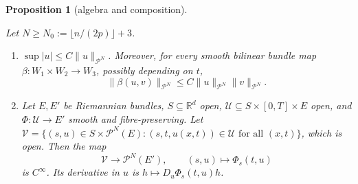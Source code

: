 \documentclass[11pt,reqno]{amsart}
\newtheorem{proposition}[theorem]{Proposition}
\theoremstyle{definition}
\theoremstyle{remark}
\newcommand{\R}{\mathbb{R}}
\newcommand{\Pp}{\mathcal{P}}
\newcommand{\norm}[1]{\lVert #1\rVert}
\newcommand{\abs}[1]{\lvert #1\rvert}
\newcommand{\lean}[1]{}
\newcommand{\uses}[1]{}
\numberwithin{equation}{section}
\begin{document}
\begin{proposition}[algebra and composition]\label{prop:nemytskii}
\lean{ShortTime.ParabolicSpace.bilinear_le, ShortTime.ParabolicSpace.contDiff_comp, ShortTime.FaaDiBruno.exists_tame_bound_graph, ShortTime.FibreMap, ShortTime.FibreMap.exists_tame_pointwise, ShortTime.parabolicInner_le_of_jetSq_le, ShortTime.exists_jetSq_le_parabolicInner, ShortTime.SmoothExtension.exists_contDiffOn_extension, ShortTime.FibreMap.fibreDeriv, ShortTime.FibreMap.taylorMap, ShortTime.FibreMap.exists_block_bound, ShortTime.FibreMap.exists_derivFam_bound, ShortTime.FibreMap.exists_taylor_bound}
\uses{def:parabolic, lem:embedding}
Let $N\ge N_0:=\lfloor n/(2p)\rfloor+3$.
\begin{enumerate}[label=(\roman*),nosep]
\item $\sup\abs u\le C\norm u_{\Pp^N}$. Moreover, for every smooth bilinear bundle map
  $\beta\colon W_1\times W_2\to W_3$, possibly depending on $t$,
  \[
    \norm{\beta(u,v)}_{\Pp^N}\le C\norm u_{\Pp^N}\norm v_{\Pp^N}.
  \]
\item Let $E,E'$ be Riemannian bundles, $S\subseteq\R^d$ open, $\mathcal U\subseteq S\times[0,T]\times E$
  open, and $\Phi\colon\mathcal U\to E'$ smooth and fibre-preserving. Let
  $\mathcal V=\{(s,u)\in S\times\Pp^N(E):(s,t,u(x,t))\in\mathcal U\text{ for all }(x,t)\}$, which is
  open. Then the map
  \[
    \mathcal V\to\Pp^N(E'),\qquad(s,u)\mapsto\Phi_s(t,u)
  \]
  is $C^\infty$. Its derivative in $u$ is $h\mapsto D_u\Phi_s(t,u)h$.
\end{enumerate}
\end{proposition}
\end{document}
